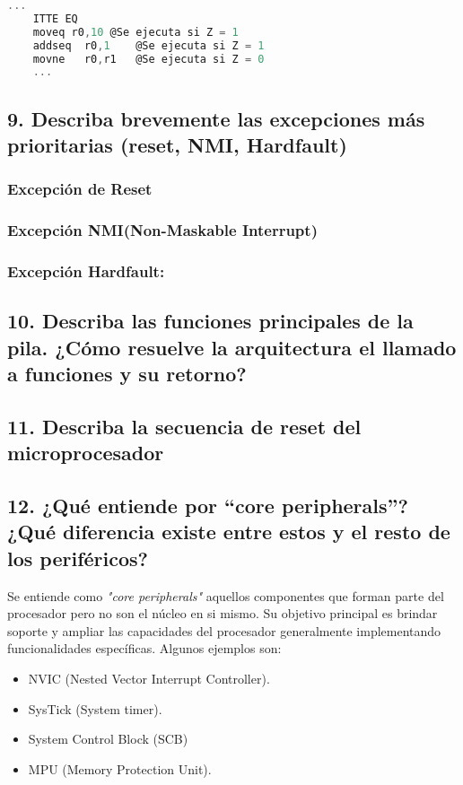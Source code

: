 \documentclass[10pt,a4paper,twoside,spanish]{article}	%
\begin{document}
\begin{lstlisting}[language=C]
	...
	ITTE EQ
	moveq r0,10	@Se ejecuta si Z = 1
	addseq	r0,1	@Se ejecuta si Z = 1
	movne	r0,r1	@Se ejecuta si Z = 0		
	...

\end{lstlisting}


\subsection*{9. Describa brevemente las excepciones más prioritarias (reset, NMI, Hardfault)}

\subsubsection*{Excepción de Reset}

\subsubsection*{Excepción NMI(Non-Maskable Interrupt)} 


\subsubsection*{Excepción Hardfault:}


\subsection*{10. Describa las funciones principales de la pila. ¿Cómo resuelve la arquitectura el llamado a funciones y su retorno?}

\subsection*{11. Describa la secuencia de reset del microprocesador}

\subsection*{12. ¿Qué entiende por “core peripherals”? ¿Qué diferencia existe entre estos y el resto de los periféricos?}

Se entiende como \textit{"core peripherals"} aquellos componentes que forman parte del procesador pero no son el núcleo en si mismo. Su objetivo principal es brindar soporte y ampliar las capacidades del procesador generalmente implementando funcionalidades específicas. Algunos ejemplos son:
\begin{itemize}

\item NVIC (Nested Vector Interrupt Controller).
\item SysTick (System timer).
\item System Control Block (SCB)
\item MPU (Memory Protection Unit).
\end{itemize}
\end{document}
